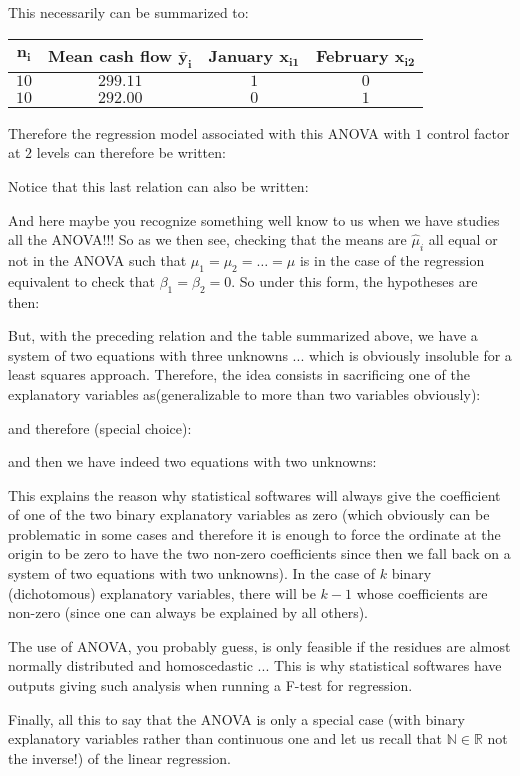 	This necessarily can be summarized to:
	\begin{table}[H]
	\centering
			\begin{tabular}{|c|c|c|c|}
				\hline
				\cellcolor{black!30}\textbf{$\pmb{n_i}$} & \cellcolor{black!30}\textbf{Mean cash flow $\pmb{\bar{y}_i}$} & \cellcolor{black!30}\textbf{January $\pmb{x_{i1}}$} & \cellcolor{black!30}\textbf{February $\pmb{x_{i2}}$} \\ \hline
				$10$ & $299.11$ & $1$ & $0$ \\ \hline
				$10$ & $292.00$ & $0$ & $1$ \\ \hline
		\end{tabular}
	\end{table}
	Therefore the regression model associated with this ANOVA with $1$ control factor at $2$ levels can therefore be written:
	
	\begin{tcolorbox}[title=Remark,colframe=black,arc=10pt]
	Notice that this last relation can also be written:
	
	And here maybe you recognize something well know to us when we have studies all the ANOVA!!! So as we then see, checking that the means are $\hat{\mu}_i$ all equal or not in the ANOVA such that $\mu_1=\mu_2=\ldots=\mu$ is in the case of the regression equivalent to check that $\beta_1=\beta_2=0$. So under this form, the hypotheses are then:
	
	\end{tcolorbox}
	But, with the preceding relation and the table summarized above, we have a system of two equations with three unknowns ... which is obviously insoluble for a least squares approach. Therefore, the idea consists in sacrificing one of the explanatory variables as(generalizable to more than two variables obviously):
	
	and therefore (special choice):
	
	and then we have indeed two equations with two unknowns:
	
	This explains the reason why statistical softwares will always give the coefficient of one of the two binary explanatory variables as zero (which obviously can be problematic in some cases and therefore it is enough to force the ordinate at the origin to be zero to have the two non-zero coefficients since then we fall back on a system of two equations with two unknowns). In the case of $k$ binary (dichotomous) explanatory variables, there will be $k - 1$ whose coefficients are non-zero (since one can always be explained by all others).
	\begin{tcolorbox}[title=Remark,colframe=black,arc=10pt]
	The use of ANOVA, you probably guess, is only feasible if the residues are almost normally distributed and homoscedastic ... This is why statistical softwares have outputs giving such analysis when running a F-test for regression. 
	\end{tcolorbox}
	Finally, all this to say that the ANOVA is only a special case (with binary explanatory variables rather than continuous one and let us recall that $\mathbb{N}\in\mathbb{R}$ not the inverse!) of the linear regression.

